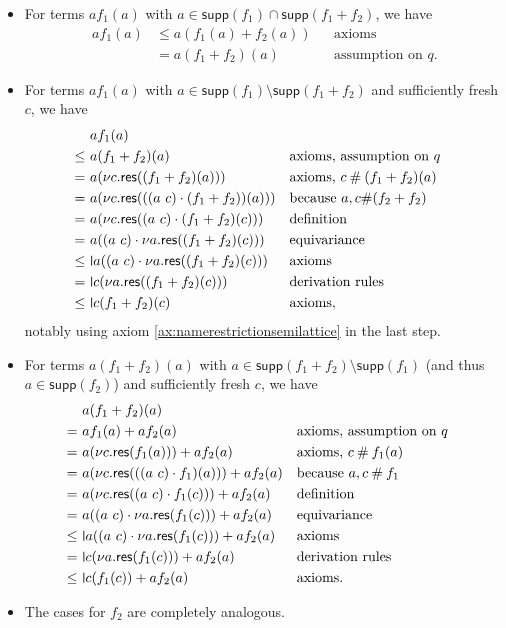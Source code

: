 \documentclass[11pt,a4paper]{amsart}
\newcommand{\res}{\mathsf{res}}
\newcommand{\fresh}{\mathbin{\#}}
\newcommand{\supp}{\mathsf{supp}}
\theoremstyle{plain}
\newcommand{\midmid}{\hspace{0.2ex}{\rule[-0.1ex]{0.6pt}{1.65ex}}\hspace{0.2ex}}
\newcommand{\newletter}[1]{{\midmid}#1}
\numberwithin{equation}{section}
\newcommand{\+}[1]{\mathcal{#1}\xspace}
\theoremstyle{definition}
\begin{document}
\begin{itemize}
  \item For terms \(af_1(a)\) with \(a \in \supp(f_1) \cap \supp(f_1 + f_2)\), we have
    \begin{align*}
      af_1(a)
      &\le a(f_1(a) + f_2(a)) && \text{axioms} \\
      &= a(f_1 + f_2)(a) && \text{assumption on $q$}.
    \end{align*}
  \item For terms \(af_1(a)\) with \(a \in \supp(f_1) \setminus \supp(f_1 + f_2)\) and sufficiently fresh \(c\), we have
    \begin{align*}
      &af_1(a) \\
      \le~&a(f_1 + f_2)(a) && \text{axioms, assumption on $q$} \\
      =~&a(\nu c.\res((f_1 + f_2)(a))) && \text{axioms, } c\fresh(f_1 + f_2)(a) \\
      =~&a(\nu c.\res(((a\ c) \cdot (f_1 + f_2))(a))) && \text{because } a,c\#(f_2 + f_2) \\
      =~&a(\nu c.\res((a\ c) \cdot (f_1 + f_2)(c))) && \text{definition} \\
      =~&a((a\ c) \cdot \nu a.\res((f_1 + f_2)(c))) && \text{equivariance} \\
      \le~&\newletter{a}((a\ c) \cdot \nu a.\res((f_1 + f_2)(c))) && \text{axioms} \\
      =~&\newletter{c}(\nu a.\res((f_1 + f_2)(c))) && \text{derivation rules} \\
      \le~&\newletter{c}(f_1 + f_2)(c) && \text{axioms},
    \end{align*}
    notably using axiom \eqref{ax:namerestrictionsemilattice} in the last step.
  \item For terms \(a(f_1 + f_2)(a)\) with \(a \in \supp(f_1 + f_2) \setminus \supp(f_1)\) (and thus \(a \in \supp(f_2)\)) and sufficiently fresh \(c\), we have
    \begin{align*}
      &a(f_1 + f_2)(a) \\
      =~&af_1(a) + af_2(a) && \text{axioms, assumption on $q$} \\
      =~&a(\nu c.\res(f_1(a))) + af_2(a) && \text{axioms, }  c\fresh f_1(a) \\
      =~&a(\nu c.\res(((a\ c) \cdot f_1)(a))) + af_2(a) && \text{because } a,c\fresh f_1 \\
      =~&a(\nu c.\res((a\ c) \cdot f_1(c))) + af_2(a) && \text{definition} \\
      =~&a((a\ c) \cdot \nu a.\res(f_1(c))) + af_2(a) && \text{equivariance} \\
      \le~&\newletter{a}((a\ c) \cdot \nu a.\res(f_1(c))) + af_2(a) && \text{axioms} \\
      =~&\newletter{c}(\nu a.\res(f_1(c))) + af_2(a) && \text{derivation rules} \\
      \le~&\newletter{c}(f_1(c)) + af_2(a) && \text{axioms}.
    \end{align*}
  \item The cases for \(f_2\) are completely analogous.
\end{itemize}
\end{document}
